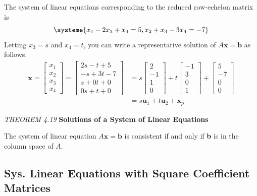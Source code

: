 \documentclass{article}
\newcommand\B{\textbf}
\newcommand\tcl{\begin{tcolorbox}[colback = {blue9}]}
\newcommand\etcl{\end{tcolorbox}}
\begin{document}
\begin{tcolorbox}
    The system of linear equations corresponding to the reduced row-echelon matrix is 
    \[ \systeme {
            x_1 - 2x_3 + x_4 = 5,
            x_2 + x_3 - 3x_4 = -7
        } \]
    Letting $x_3 = s$ and $x_4 = t$, you can write a representative solution of $A\B{x} = \B{b}$ as follows.
    \begin{equation*}
        \begin{split} 
    \B{x} = \begin{bmatrix}
        x_1 \\ x_2 \\ x_3 \\ x_4 
    \end{bmatrix} = \begin{bmatrix}
        2s - t + 5 \\ -s + 3t - 7 \\ s + 0t + 0 \\ 0s + t + 0
        \end{bmatrix} & = s \begin{bmatrix}
        2 \\ -1 \\ 1 \\ 0
    \end{bmatrix} + t \begin{bmatrix}
    -1 \\ 3 \\ 0  \\ 1
    \end{bmatrix} + \begin{bmatrix}
        5 \\ -7 \\ 0 \\ 0 
    \end{bmatrix} \\
    & = s\B{u}_1 + t\B{u}_2 + \B{x}_p 
    \end{split}
    \end{equation*}

    \tcl
    \textit{THEOREM 4.19 } \textbf{Solutions of a System of Linear Equations}

    The system of linear equation $A\B{x} = \B{b}$ is consistent if and only if \B{b} is in the column
    space of $A$.
    \etcl 

    \subsection{Sys. Linear Equations with Square Coefficient Matrices}


\end{tcolorbox}
\end{document}
